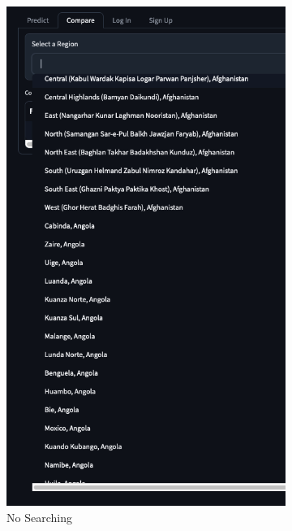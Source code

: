 \documentclass[12pt]{report}
\begin{document}
\begin{figure}[H]
\centering
\begin{subfigure}{.45\linewidth}
    \centering
    \includegraphics[width=\linewidth]{ss17.3a.png}
    \caption{No Searching}
\end{subfigure}
\begin{subfigure}{.45\linewidth}
    \centering

\end{subfigure}
\end{figure}
\end{document}
